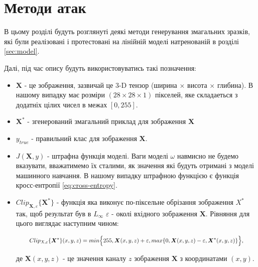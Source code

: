 \documentclass[a4paper,14pt]{extreport}
\begin{document}
	
	\chapter{Методи атак}
	В цьому розділі будуть розглянуті деякі методи генерування змагальних зразків, які були реалізовані і протестовані на лінійній моделі натренованій в розділі \ref{sec:model}.
	
	Далі, під час опису будуть використовуватись такі позначення:
	\begin{itemize}
		\item $\boldsymbol{X}$ - це зображення, зазвичай це 3-D тензор (ширина $\times$ висота $\times$ глибина). В нашому випадку має розміри $(28 \times 28 \times 1)$ пікселей, яке складаеться з додатніх цілих чисел в межах $[0, 255]$.
		\item $\boldsymbol{X}^{*}$ - згенерований змагальний приклад для зображення $\boldsymbol{X}$
		\item $y_{true}$ - правильний клас для зображення $\boldsymbol{X}$.
		\item $J(\boldsymbol{X}, y)$ - штрафна функція моделі. Ваги моделі $\omega$ навмисно не будемо вказувати, вважатимемо їх сталими, як значення які будуть отримані з моделі машинного навчання. В нашому випадку штрафною функцією є функція кросс-ентропії \ref{eq:cross-entropy}. 
		\item $Clip_{\boldsymbol{X}, \varepsilon} \{ \boldsymbol{X}^{*} \}$ - функція яка виконує по-піксельне обрізання зображення $X^{*}$ так, щоб результат був в $L_{\infty}$ $\varepsilon $ - околі вхідного зображення $\boldsymbol{X}$. Рівняння для цього виглядає наступним чином:
		
		\begingroup
		\setlength{\abovedisplayskip}{0pt}
		\setlength{\belowdisplayskip}{0pt}
		\begin{align}
		\label{eq:clip}
		\resizebox{.9 \textwidth}{!} 
		{
			$
			Clip_{X, \varepsilon} \{ \boldsymbol{X}^{*} \}(x, y, z) = 
			min\Big\{ 255, \boldsymbol{X}(x, y, z) + \varepsilon, max \{ 0, \boldsymbol{X}(x, y, z) - \varepsilon, \boldsymbol{X}^{*}(x, y, z) \} \Big\}
			$,
		}
		\end{align}
		\endgroup

		де $\boldsymbol{X}(x, y, z)$ - це значення каналу $z$ зображення $\boldsymbol{X}$ з координатами $(x, y)$.
	\end{itemize}
\end{document}
